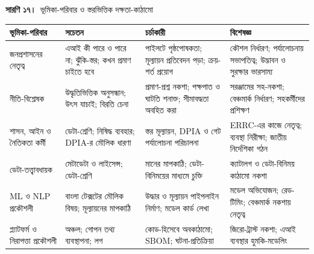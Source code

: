 \documentclass[border=10pt]{standalone}
\begin{document}
\begin{minipage}{17cm}
{\large\bfseries সারণি ১৭।}\ {\large ভূমিকা-পরিবার ও স্তরভিত্তিক দক্ষতা-কাঠামো}\par\vspace{7pt}
\small
{}
\begin{tabularx}{\linewidth}{@{}>{\hsize=0.870\hsize\raggedright\arraybackslash}X>{\hsize=1.043\hsize\raggedright\arraybackslash}X>{\hsize=1.043\hsize\raggedright\arraybackslash}X>{\hsize=1.043\hsize\raggedright\arraybackslash}X@{}}
\arrayrulecolor{bapilrule}\toprule
\rowcolor{white}\textbf{ভূমিকা-পরিবার} & \textbf{সচেতন} & \textbf{চর্চাকারী} & \textbf{বিশেষজ্ঞ} \\
\midrule
জনপ্রশাসনের নেতৃত্ব & এআই কী পারে ও পারে না; ঝুঁকি-স্তর; কখন প্রমাণ চাইতে হবে & পাইলটে পৃষ্ঠপোষকতা; মূল্যায়ন প্রতিবেদন পড়া; ক্রয়-শর্ত প্রয়োগ & কৌশল নির্ধারণ; পর্যালোচনায় সভাপতিত্ব; উদ্ভাবন ও সুরক্ষার ভারসাম্য \\
নীতি-বিশ্লেষক & উদ্ধৃতিভিত্তিক অনুসন্ধান; উৎস যাচাই; বিরতি চেনা & প্রমাণ-প্রশ্ন নকশা; পক্ষপাত ও ঘাটতি শনাক্ত; সীমাবদ্ধতা অবহিত করা & সরঞ্জামের সহ-নকশা; বেঞ্চমার্ক নির্ধারণ; সহকর্মীদের প্রশিক্ষণ \\
শাসন, আইন ও নৈতিকতা কর্মী & ডেটা-শ্রেণি; নিষিদ্ধ ব্যবহার; DPIA-র মৌলিক ধারণা & স্তর মূল্যায়ন, DPIA ও গেট পর্যালোচনা পরিচালনা & ERRC-এর কাজে নেতৃত্ব; ব্যবস্থা নিরীক্ষা; জাতীয় নির্দেশিকা গঠন \\
ডেটা-তত্ত্বাবধায়ক & মেটাডেটা ও লাইসেন্স; ডেটা-শ্রেণি & মানের মাপকাঠি; ডেটা-বিনিময়ের মাধ্যমে চুক্তি & ক্যাটালগ ও ডেটা-বিনিময় কাঠামো নকশা \\
ML ও NLP প্রকৌশলী & বাংলা টেক্সটের মৌলিক বিষয়; মূল্যায়নের মাপকাঠি & উদ্ধার ও মূল্যায়ন পাইপলাইন নির্মাণ; মডেল কার্ড লেখা & মডেল অভিযোজন; রেড-টিমিং; বেঞ্চমার্ক নকশায় নেতৃত্ব \\
প্ল্যাটফর্ম ও নিরাপত্তা প্রকৌশলী & অঞ্চল; গোপন তথ্য ব্যবস্থাপনা; লগ & কোড-হিসেবে অবকাঠামো; SBOM; ঘটনা-প্রতিক্রিয়া & জিরো-ট্রাস্ট নকশা; এআই ব্যবস্থার হুমকি-মডেলিং \\
\bottomrule
\end{tabularx}
\par{}
\end{minipage}
\end{document}
